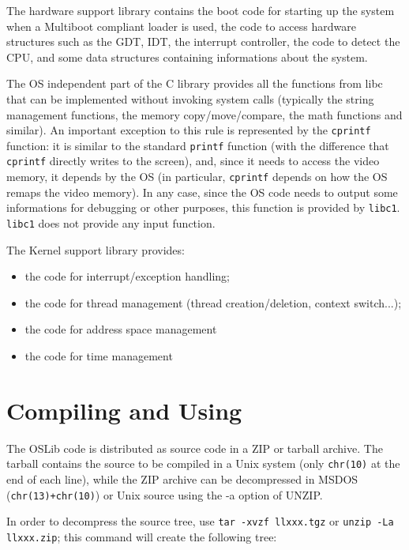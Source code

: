 \documentclass[a4paper]{report}
\begin{document}
The hardware support library contains the boot code for starting up
the system when a Multiboot compliant loader is used, the code to
access hardware structures such as the GDT, IDT, the interrupt
controller, the code to detect the CPU, and some data structures
containing informations about the system.

The OS independent part of the C library provides all the functions
from libc that can be implemented without invoking system calls
(typically the string management functions, the memory
copy/move/compare, the math functions and similar). An important
exception to this rule is represented by the {\tt cprintf} function:
it is similar to the standard {\tt printf} function (with the
difference that {\tt cprintf} directly writes to the screen), and,
since it needs to access the video memory, it depends by the OS (in
particular, {\tt cprintf} depends on how the OS remaps the video
memory). In any case, since the OS code needs to output some
informations for debugging or other purposes, this function is
provided by {\tt libc1}. {\tt libc1} does not provide any input
function.

The Kernel support library provides: \begin{itemize}
\item the code for interrupt/exception handling;
\item the code for thread management (thread creation/deletion,
	context switch...);
\item the code for address space management
\item the code for time management
\end{itemize}

\section{Compiling and Using}
The OSLib code is distributed as source code in a ZIP or tarball
archive. The tarball contains the source to be compiled in a Unix
system (only  {\tt chr(10)} at the end of each line), while the ZIP
archive can be decompressed in MSDOS ({\tt chr(13)+chr(10)}) or Unix
source using the -a option of UNZIP.

In order to decompress the source tree, use {\tt tar -xvzf llxxx.tgz}
or {\tt unzip -La llxxx.zip}; this command will create the following
tree:
\end{document}
